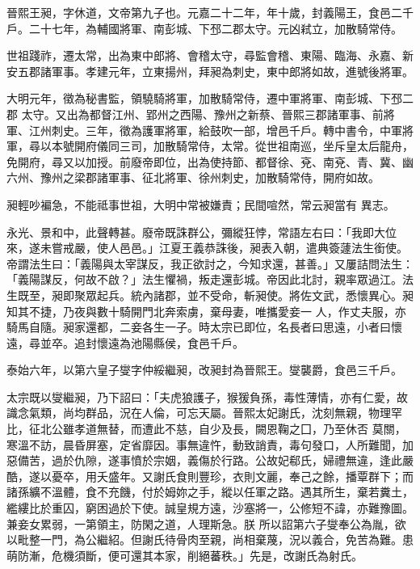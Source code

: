 \begin{pinyinscope}
 晉熙王昶，字休道，文帝第九子也。元嘉二十二年，年十歲，封義陽王，食邑二千戶。二十七年，為輔國將軍、南彭城、下邳二郡太守。元凶弒立，加散騎常侍。



 世祖踐祚，遷太常，出為東中郎將、會稽太守，尋監會稽、東陽、臨海、永嘉、新安五郡諸軍事。孝建元年，立東揚州，拜昶為刺史，東中郎將如故，進號後將軍。



 大明元年，徵為秘書監，領驍騎將軍，加散騎常侍，遷中軍將軍、南彭城、下邳二郡
 太守。又出為都督江州、郢州之西陽、豫州之新蔡、晉熙三郡諸軍事、前將軍、江州刺史。三年，徵為護軍將軍，給鼓吹一部，增邑千戶。轉中書令，中軍將軍，尋以本號開府儀同三司，加散騎常侍，太常。從世祖南巡，坐斥皇太后龍舟，免開府，尋又以加授。前廢帝即位，出為使持節、都督徐、兗、南兗、青、冀、幽六州、豫州之梁郡諸軍事、征北將軍、徐州刺史，加散騎常侍，開府如故。



 昶輕吵褊急，不能祗事世祖，大明中常被嫌責；民間喧然，常云昶當有
 異志。



 永光、景和中，此聲轉甚。廢帝既誅群公，彌縱狂悖，常語左右曰：「我即大位來，遂未嘗戒嚴，使人邑邑。」江夏王義恭誅後，昶表入朝，遣典簽蘧法生銜使。帝謂法生曰：「義陽與太宰謀反，我正欲討之，今知求還，甚善。」又屢詰問法生：「義陽謀反，何故不啟？」法生懼禍，叛走還彭城。帝因此北討，親率眾過江。法生既至，昶即聚眾起兵。統內諸郡，並不受命，斬昶使。將佐文武，悉懷異心。昶知其不捷，乃夜與數十騎開門北奔索虜，棄母妻，唯攜愛妾一
 人，作丈夫服，亦騎馬自隨。昶家還都，二妾各生一子。時太宗已即位，名長者曰思遠，小者曰懷遠，尋並卒。追封懷遠為池陽縣侯，食邑千戶。



 泰始六年，以第六皇子燮字仲綏繼昶，改昶封為晉熙王。燮襲爵，食邑三千戶。



 太宗既以燮繼昶，乃下詔曰：「夫虎狼護子，猴猨負孫，毒性薄情，亦有仁愛，故識念氣類，尚均群品，況在人倫，可忘天屬。晉熙太妃謝氏，沈刻無親，物理罕比，征北公雖孝道無替，而遭此不慈，自少及長，闕恩鞠之囗，乃至休否
 莫關，寒溫不訪，晨昏屏塞，定省靡因。事無違忤，動致誚責，毒句發口，人所難聞，加惡備苦，過於仇隙，遂事憤於宗姻，義傷於行路。公故妃郗氏，婦禮無違，逢此嚴酷，遂以憂卒，用夭盛年。又謝氏食則豐珍，衣則文麗，奉己之餘，播覃群下；而諸孫纊不溫體，食不充饑，付於姆妳之手，縱以任軍之路。遇其所生，棄若糞土，繿縷比於重囚，窮困過於下使。誠皇規方遠，沙塞將一，公修短不諱，亦難豫圖。兼妾女累弱，一第領主，防閑之道，人理斯急。朕
 所以詔第六子燮奉公為胤，欲以毗整一門，為公繼紹。但謝氏待骨肉至親，尚相棄蔑，況以義合，免苦為難。患萌防漸，危機須斷，便可還其本家，削絕蕃秩。」先是，改謝氏為射氏。




\end{pinyinscope}
